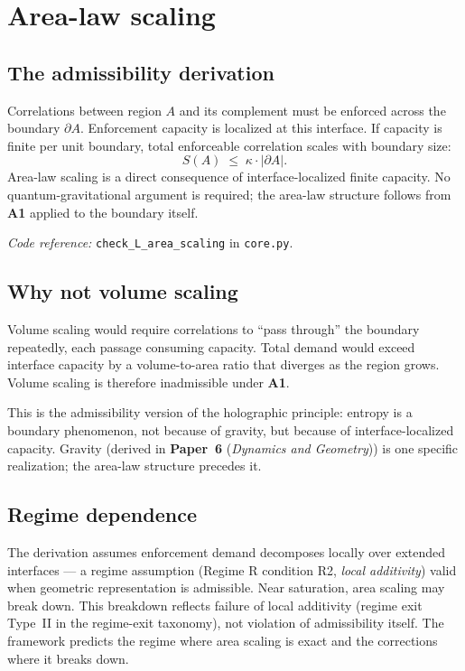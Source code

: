 \documentclass[11pt]{article}
\newcommand{\coderef}[2]{\smallskip\noindent\textit{Code reference:} \texttt{#1} in \texttt{#2}.}
\newcommand{\Aone}{\textbf{A1}}
\newcommand{\paperref}[2]{\textbf{Paper~#1} (\textit{#2})}
\theoremstyle{definition}
\begin{document}
\clearpage

\section{Area-law scaling}\label{sec:area_law}

\subsection{The admissibility derivation}\label{sec:area_law_derivation}

Correlations between region $A$ and its complement must be enforced across the boundary $\partial A$. Enforcement capacity is localized at this interface. If capacity is finite per unit boundary, total enforceable correlation scales with boundary size:
\[
S(A) \;\leq\; \kappa \cdot |\partial A|.
\]
Area-law scaling is a direct consequence of interface-localized finite capacity. No quantum-gravitational argument is required; the area-law structure follows from \Aone{} applied to the boundary itself.

\coderef{check\_L\_area\_scaling}{core.py}

\subsection{Why not volume scaling}\label{sec:area_law_why_not_volume}

Volume scaling would require correlations to ``pass through'' the boundary repeatedly, each passage consuming capacity. Total demand would exceed interface capacity by a volume-to-area ratio that diverges as the region grows. Volume scaling is therefore inadmissible under \Aone{}.

This is the admissibility version of the holographic principle: entropy is a boundary phenomenon, not because of gravity, but because of interface-localized capacity. Gravity (derived in \paperref{6}{Dynamics and Geometry}) is one specific realization; the area-law structure precedes it.

\subsection{Regime dependence}\label{sec:area_law_regime}

The derivation assumes enforcement demand decomposes locally over extended interfaces --- a regime assumption (Regime R condition R2, \emph{local additivity}) valid when geometric representation is admissible. Near saturation, area scaling may break down. This breakdown reflects failure of local additivity (regime exit Type~II in the regime-exit taxonomy), not violation of admissibility itself. The framework predicts the regime where area scaling is exact and the corrections where it breaks down.
\end{document}

